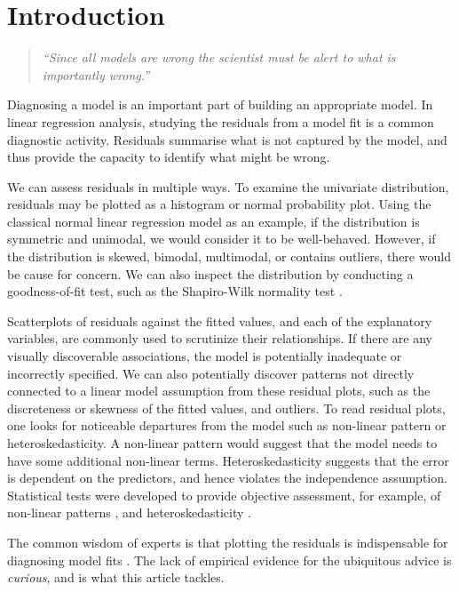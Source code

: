 \documentclass[]{interact}
\theoremstyle{plain}%
\theoremstyle{definition}
\theoremstyle{remark}
\begin{document}
\hypertarget{introduction}{%
\section{Introduction}\label{introduction}}

\begin{quote}
\emph{``Since all models are wrong the scientist must be alert to what
is importantly wrong.''} \citep{box1976science}
\end{quote}

Diagnosing a model is an important part of building an appropriate
model. In linear regression analysis, studying the residuals from a
model fit is a common diagnostic activity. Residuals summarise what is
not captured by the model, and thus provide the capacity to identify
what might be wrong.

We can assess residuals in multiple ways. To examine the univariate
distribution, residuals may be plotted as a histogram or normal
probability plot. Using the classical normal linear regression model as
an example, if the distribution is symmetric and unimodal, we would
consider it to be well-behaved. However, if the distribution is skewed,
bimodal, multimodal, or contains outliers, there would be cause for
concern. We can also inspect the distribution by conducting a
goodness-of-fit test, such as the Shapiro-Wilk normality test
\citep{shapiro1965analysis}.

Scatterplots of residuals against the fitted values, and each of the
explanatory variables, are commonly used to scrutinize their
relationships. If there are any visually discoverable associations, the
model is potentially inadequate or incorrectly specified. We can also
potentially discover patterns not directly connected to a linear model
assumption from these residual plots, such as the discreteness or
skewness of the fitted values, and outliers. To read residual plots, one
looks for noticeable departures from the model such as non-linear
pattern or heteroskedasticity. A non-linear pattern would suggest that
the model needs to have some additional non-linear terms.
Heteroskedasticity suggests that the error is dependent on the
predictors, and hence violates the independence assumption. Statistical
tests were developed to provide objective assessment, for example, of
non-linear patterns \citep[e.g.][]{ramsey1969tests}, and
heteroskedasticity \citep[e.g.][]{breusch1979simple}.

The common wisdom of experts is that plotting the residuals is
indispensable for diagnosing model fits
\citep{draper1998applied, cook1982residuals, montgomery1982introduction}.
The lack of empirical evidence for the ubiquitous advice is
\emph{curious}, and is what this article tackles.
\end{document}
